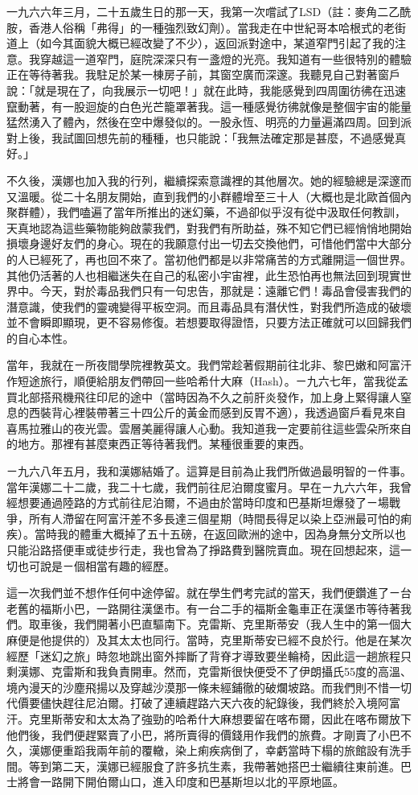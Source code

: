 一九六六年三月，二十五歲生日的那一天，我第一次嚐試了LSD（註：麥角二乙酰胺，香港人俗稱「弗得」的一種強烈致幻劑）。當我走在中世紀哥本哈根式的老街道上（如今其面貌大概已經改變了不少），返回派對途中，某道窄門引起了我的注意。我穿越這一道窄門，庭院深深只有一盞燈的光亮。我知道有一些很特別的體驗正在等待著我。我駐足於某一棟房子前，其窗空廣而深邃。我聽見自己對著窗戶說：「就是現在了，向我展示一切吧！」就在此時，我能感覺到四周圍彷彿在迅速竄動著，有一股迴旋的白色光芒籠罩著我。這一種感覺彷彿就像是整個宇宙的能量猛然湧入了體內，然後在空中爆發似的。一股永恆、明亮的力量遍滿四周。回到派對上後，我試圖回想先前的種種，也只能說：「我無法確定那是甚麼，不過感覺真好。」

不久後，漢娜也加入我的行列，繼續探索意識裡的其他層次。她的經驗總是深邃而又溫暖。從二十名朋友開始，直到我們的小群體增至三十人（大概也是北歐首個內聚群體），我們嗑遍了當年所推出的迷幻藥，不過卻似乎沒有從中汲取任何教訓，天真地認為這些藥物能夠啟蒙我們，對我們有所助益，殊不知它們已經悄悄地開始損壞身邊好友們的身心。現在的我願意付出一切去交換他們，可惜他們當中大部分的人已經死了，再也回不來了。當初他們都是以非常痛苦的方式離開這一個世界。其他仍活著的人也相繼迷失在自己的私密小宇宙裡，此生恐怕再也無法回到現實世界中。今天，對於毒品我們只有一句忠告，那就是：遠離它們！毒品會侵害我們的潛意識，使我們的靈魂變得平板空洞。而且毒品具有潛伏性，對我們所造成的破壞並不會瞬即顯現，更不容易修復。若想要取得證悟，只要方法正確就可以回歸我們的自心本性。

當年，我就在ㄧ所夜間學院裡教英文。我們常趁著假期前往北非、黎巴嫩和阿富汗作短途旅行，順便給朋友們帶回一些哈希什大麻（Hash）。ㄧ九六七年，當我從孟買北部搭飛機飛往印尼的途中（當時因為不久之前肝炎發作，加上身上緊得讓人窒息的西裝背心裡裝帶著三十四公斤的黃金而感到反胃不適），我透過窗戶看見來自喜馬拉雅山的夜光雲。雲層美麗得讓人心動。我知道我一定要前往這些雲朵所來自的地方。那裡有甚麼東西正等待著我們。某種很重要的東西。

ㄧ九六八年五月，我和漢娜結婚了。這算是目前為止我們所做過最明智的ㄧ件事。當年漢娜二十二歲，我二十七歲，我們前往尼泊爾度蜜月。早在ㄧ九六六年，我曾經想要通過陸路的方式前往尼泊爾，不過由於當時印度和巴基斯坦爆發了ㄧ場戰爭，所有人滯留在阿富汗差不多長達三個星期（時間長得足以染上亞洲最可怕的痢疾）。當時我的體重大概掉了五十五磅，在返回歐洲的途中，因為身無分文所以也只能沿路搭便車或徒步行走，我也曾為了掙路費到醫院賣血。現在回想起來，這一切也可說是ㄧ個相當有趣的經歷。

這一次我們並不想作任何中途停留。就在學生們考完試的當天，我們便鑽進了ㄧ台老舊的福斯小巴，一路開往漢堡市。有一台二手的福斯金龜車正在漢堡市等待著我們。取車後，我們開著小巴直驅南下。克雷斯、克里斯蒂安（我人生中的第一個大麻便是他提供的）及其太太也同行。當時，克里斯蒂安已經不良於行。他是在某次經歷「迷幻之旅」時忽地跳出窗外摔斷了背脊才導致要坐輪椅，因此這一趟旅程只剩漢娜、克雷斯和我負責開車。然而，克雷斯很快便受不了伊朗攝氏55度的高溫、境內漫天的沙塵飛揚以及穿越沙漠那一條未經鋪徹的破爛坡路。而我們則不惜一切代價要儘快趕往尼泊爾。打破了連續趕路六天六夜的紀錄後，我們終於入境阿富汗。克里斯蒂安和太太為了強勁的哈希什大麻想要留在喀布爾，因此在喀布爾放下他們後，我們便趕緊賣了小巴，將所賣得的價錢用作我們的旅費。才剛賣了小巴不久，漢娜便重蹈我兩年前的覆轍，染上痢疾病倒了，幸虧當時下榻的旅館設有洗手間。等到第二天，漢娜已經服食了許多抗生素，我帶著她搭巴士繼續往東前進。巴士將會一路開下開伯爾山口，進入印度和巴基斯坦以北的平原地區。

